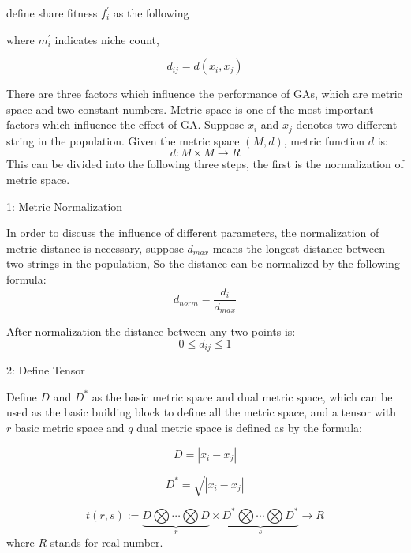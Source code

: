 \documentclass[smallextended]{svjour3}       %
\begin{document}
\begin{multicols}{2}
define share fitness $f_i^{\prime}$ as the following


where $m_i^{\prime}$ indicates niche count,





\begin{equation}
d_{ij} = d(x_i,x_j)
\end{equation}

There are three factors which influence the performance of GAs, which are metric
space and two constant numbers.  Metric space is one of the most important
factors which influence the effect of GA.  Suppose $x_i$ and $x_j$ denotes two
different string in the population. Given the metric space $(M,d)$, metric
function $d$ is: $$d: M\times M \rightarrow R$$
This can be divided into the following three steps, the first is the
normalization of metric space.

1: Metric Normalization

In order to discuss the influence of different parameters, the normalization of
metric distance is necessary, suppose $d_{max}$ means the longest distance
between two strings in the population, So the distance can be normalized by the
following formula:
\begin{equation}
d_{norm} = \frac{d_i}{d_{max}}
\end{equation}

After normalization the distance between any two points is:
\begin{equation}
    0 \leq d_{ij}\leq 1 
\end{equation}


2: Define Tensor

Define $D$ and $D^{\ast}$ as the basic metric space and dual metric space, which
can be used as the basic building block to define all the metric space, and a
tensor with $r$ basic metric space and $q$ dual metric space is defined as by
the formula:

\begin{equation}
    D = |x_i-x_j|
\end{equation}

\begin{equation}
    D^{\ast} = \sqrt{|x_i-x_j|}
\end{equation}

\begin{equation}
t(r,s):= \underbrace{D \bigotimes \cdots \bigotimes D}_{r} \times \underbrace{D^{\ast} \bigotimes 
\cdots \bigotimes D^{\ast}}_{s} \rightarrow R
\end{equation}
where $R$ stands for real number.


\end{multicols}
\end{document}
